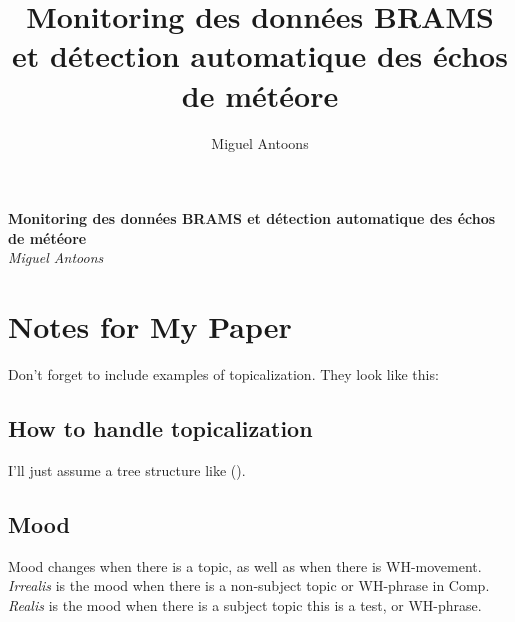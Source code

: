 \documentclass[11pt]{article}
\title{Monitoring des données BRAMS et détection automatique des échos de météore}
\author{Miguel Antoons}
\begin{document}
\begin{titlepage}
    \begin{center}
       \Large\textbf{Monitoring des données BRAMS et détection automatique des échos de météore}\\
       \large\textit{Miguel Antoons}
    \end{center}
 \end{titlepage}


\section*{Notes for My Paper}

Don't forget to include examples of topicalization.
They look like this:

{\small
{}
}

\subsection*{How to handle topicalization}

I'll just assume a tree structure like ().

{\small
{}
}

\subsection*{Mood}

Mood changes when there is a topic, as well as when
there is WH-movement.  \emph{Irrealis} is the mood when
there is a non-subject topic or WH-phrase in Comp.
\emph{Realis} is the mood when there is a subject topic this is a test,
or WH-phrase.
\end{document}

